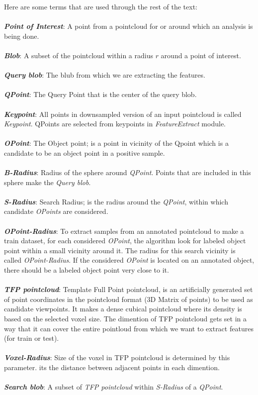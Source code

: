 Here are some terms that are used through the rest of the text:\\
\\
\textbf{\textit{Point of Interest}}: A point from a pointcloud for or around which an analysis is being done.\\
\\
\textbf{\textit{Blob}}: A subset of the pointcloud within a radius $r$ around a point of interest.\\
\\
\textbf{\textit{Query blob}}: The blub from which we are extracting the features.\\
\\
\textbf{\textit{QPoint}}: The Query Point that is the center of the query blob.\\
\\
\textbf{\textit{Keypoint}}: All points in downsampled version of an input pointcloud is called {\it Keypoint}. QPoints are selected from keypoints in {\it FeatureExtract} module.\\
\\
\textbf{\textit{OPoint}}: The Object point; is a point in vicinity of the Qpoint which is a candidate to be an object point in a positive sample.\\
\\
\textbf{\textit{B-Radius}}: Radius of the sphere around {\it QPoint}. Points that are included in this sphere make the {\it Query blob}.\\
\\
\textbf{\textit{S-Radius}}: Search Radius; is the radius around the {\it QPoint}, within which candidate {\it OPoints} are considered.\\
\\
\textbf{\textit{OPoint-Radius}}: To extract samples from an annotated pointcloud to make a train dataset, for each considered {\it OPoint}, the algorithm look for labeled object point within a small vicinity around it. The radius for this search vicinity is called {\it OPoint-Radius}. If the considered {\it OPoint} is located on an annotated object, there should be a labeled object point very close to it.\\ 
\\
\textbf{\textit{TFP pointcloud}}: Template Full Point pointcloud, is an artificially generated set of point coordinates in the pointcloud format (3D Matrix of points) to be used as candidate viewpoints. It makes a dense cubical pointcloud where its density is based on the selected voxel size. The dimention of TFP pointcloud gets set in a way that it can cover the entire pointloud from which we want to extract features (for train or test).\\
\\
\textbf{\textit{Voxel-Radius}}: Size of the voxel in TFP pointcloud is determined by this parameter. its the distance between adjacent points in each dimention.\\
\\
\textbf{\textit{Search blob}}: A subset of {\it TFP pointcloud} within {\it S-Radius} of a {\it QPoint}. 
\\

